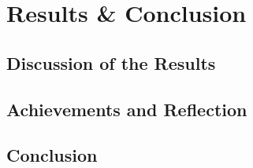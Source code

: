 \chapter{Results \& Conclusion}
\section{Discussion of the Results}
\lipsum[3-5]
\section{Achievements and Reflection}
\lipsum[7-9]
\section{Conclusion}
\lipsum[10-13]